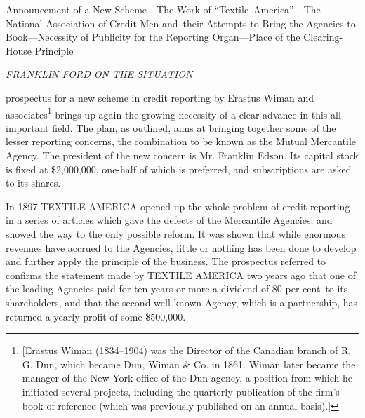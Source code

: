 \documentclass[twoside,symmetric,nobib,justified]{tufte-book}
\begin{document}
\vspace{0.4in}
\begin{center}
    
\begin{spacing}{1.25}


{\LARGE Announcement of a New Scheme---The Work of ``Textile~America''---The
National Association of Credit Men and~their Attempts to Bring the
Agencies to Book---Necessity of Publicity for the Reporting
Organ---Place of the Clearing-House Principle}

\end{spacing}

\vspace{0.25in}

{\LARGE \emph{FRANKLIN FORD ON THE SITUATION}}

\vspace{0.15in}

\enlargethispage{\baselineskip}

\end{center}

 prospectus for a new scheme in credit reporting by
Erastus Wiman and associates\footnote{{[}Erastus Wiman (1834--1904) was
  the Director of the Canadian branch of R. G. Dun, which became Dun,
  Wiman \& Co. in 1861. Wiman later became the manager of the New York
  office of the Dun agency, a position from which he initiated several
  projects, including the quarterly publication of the firm's book of
  reference (which was previously published on an annual basis).{]}}
brings up again the growing necessity of a clear advance in this
all-important field. The plan, as outlined, aims at bringing together
some of the lesser reporting concerns, the combination to be known as
the Mutual Mercantile Agency. The president of the new concern is Mr.
Franklin Edson. Its capital stock is fixed at \$2,000,000, one-half of
which is preferred, and subscriptions are asked to its shares.~

In 1897 TEXTILE AMERICA opened up the whole problem of credit reporting
in a series of articles which gave the defects of the Mercantile
Agencies, and showed the way to the only possible reform. It was shown
that while enormous revenues have accrued to the Agencies, little or
nothing has been done to develop and further apply the principle of the
business. The prospectus referred to confirms the statement made by
TEXTILE AMERICA two years ago that one of the leading Agencies paid for
ten years or more a dividend of 80 per cent~to its shareholders, and
that the second well-known Agency, which is a partnership, has returned
a yearly profit of some \$500,000.~
\end{document}
